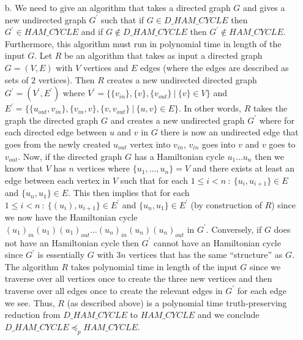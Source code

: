 \documentclass [10pt]{article}
\newcommand{\reduces}{\preceq}%
\begin{document}
\begin{enumerate}
\begin{enumerate}
		\item[b.]We need to give an algorithm that takes a directed graph $G$ and gives a new undirected graph $G^{\prime}$ such that if $G\in D\_HAM\_CYCLE$ then $G^{\prime}\in HAM\_CYCLE$ and if $G\notin D\_HAM\_CYCLE$ then $G^{\prime}\notin HAM\_CYCLE$. Furthermore, this algorithm must run in polynomial time in length of the input $G$. Let $R$ be an algorithm that takes as input a directed graph $G=(V,E)$ with $V$ vertices and $E$ edges (where the edges are described as sets of $2$ vertices). Then $R$ creates a new undirected directed graph $G^{\prime}=(V^{\prime},E^{\prime})$ where $V^{\prime}=\{\{v_{in}\},\{v\},\{v_{out}\}\:|\:\{v\}\in V\}$ and $E^{\prime}=\{\{u_{out},v_{in}\},\{v_{in},v\},\{v,v_{out}\}\:|\:\{u,v\}\in E\}$. In other words, $R$ takes the graph the directed graph $G$ and creates a new undirected graph $G^{\prime}$ where for each directed edge between $u$ and $v$ in $G$ there is now an undirected edge that goes from the newly created $u_{out}$ vertex into $v_{in}$, $v_{in}$ goes into $v$ and $v$ goes to $v_{out}$. Now, if the directed graph $G$ has a Hamiltonian cycle $u_{1}\dots u_{n}$ then we know that $V$ has $n$ vertices where $\{u_{1},\dots,u_{n}\}=V$ and there exists at least an edge between each vertex in $V$ such that for each $1\le i< n\::\:\{u_{i},u_{i+1}\}\in E$ and $\{u_{n},u_{1}\}\in E$. This then implies that for each $1\le i< n\::\:\{(u_{i}),u_{i+1}\}\in E^{\prime}$ and $\{u_{n},u_{1}\}\in E^{\prime}$ (by construction of $R$) since we now have the Hamiltonian cycle $(u_{1})_{in}(u_{1})(u_{1})_{out}\dots(u_{n})_{in}(u_{n})(u_{n})_{out}$ in $G^{\prime}$. Conversely, if $G$ does not have an Hamiltonian cycle then $G^{\prime}$ cannot have an Hamiltonian cycle since $G^{\prime}$ is essentially $G$ with $3n$ vertices that has the same ``structure'' as $G$. The algorithm $R$ takes polynomial time in length of the input $G$ since we traverse over all vertices once to create the three new vertices and then traverse over all edges once to create the relevant edges in $G^{\prime}$ for each edge we see. Thus, $R$ (as described above) is a polynomial time truth-preserving reduction from $D\_HAM\_CYCLE$ to $HAM\_CYCLE$ and we conclude $D\_HAM\_CYCLE\reduces_{p}HAM\_CYCLE$.
	\end{enumerate}
\end{enumerate}
\end{document}
